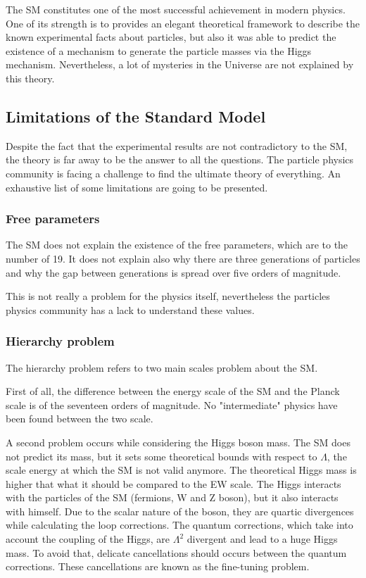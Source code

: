   The \acrshort{SM} constitutes one of the most successful achievement in modern physics.
  One of its strength is to provides an elegant theoretical framework to describe the known experimental facts about particles, but also it was able to predict 
  the existence of a mechanism to generate the particle masses via the Higgs mechanism.
  Nevertheless, a lot of mysteries in the Universe are not explained by this theory. 
  
  \subsection{Limitations of the Standard Model}

  Despite the fact that the experimental results are not contradictory to the \acrshort{SM}, the theory is far away to be the answer to all the questions.
  The particle physics community is facing a challenge to find the ultimate theory of everything.
  An exhaustive list of some limitations are going to be presented.

    \subsubsection{Free parameters}

    The \acrshort{SM} does not explain the existence of the free parameters, which are to the number of 19.
    It does not explain also why there are three generations of particles and why the gap between generations is spread over five orders of magnitude.

    This is not really a problem for the physics itself, nevertheless the particles physics community has a lack to understand these values.
  
    \subsubsection{Hierarchy problem}

    The hierarchy problem refers to two main scales problem about the \acrshort{SM}.

    First of all, the difference between the energy scale of the \acrshort{SM} and the Planck scale is of the seventeen orders of magnitude.
    No "intermediate" physics have been found between the two scale.

    A second problem occurs while considering the Higgs boson mass.
    The \acrshort{SM} does not predict its mass, but it sets some theoretical bounds with respect to $\Lambda$, the scale energy at which the \acrshort{SM} is not valid anymore.
    The theoretical Higgs mass is higher that what it should be compared to the EW scale.
    The Higgs interacts with the particles of the \acrshort{SM} (fermions, W and Z boson), but it also interacts with himself.
    Due to the scalar nature of the boson, they are quartic divergences while calculating the loop corrections.
    The quantum corrections, which take into account the coupling of the Higgs, are $\Lambda^2$ divergent and lead to a huge Higgs mass.
    To avoid that, delicate cancellations should occurs between the quantum corrections.
    These cancellations are known as the fine-tuning problem. 
    
